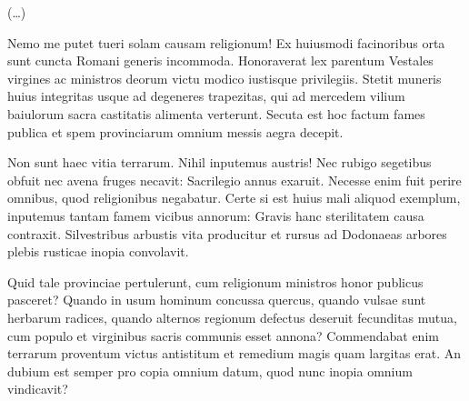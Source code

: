 (\dots)

Nemo me putet tueri solam causam religionum! Ex huiusmodi facinoribus orta sunt cuncta Romani generis incommoda. Honoraverat lex parentum Vestales virgines ac ministros deorum victu modico iustisque privilegiis. Stetit muneris huius integritas usque ad degeneres trapezitas, qui ad mercedem vilium baiulorum sacra castitatis alimenta verterunt. Secuta est hoc factum fames publica et spem provinciarum omnium messis aegra decepit.

Non sunt haec vitia terrarum. Nihil inputemus austris! Nec rubigo segetibus obfuit nec avena fruges necavit: Sacrilegio annus exaruit. Necesse enim fuit perire omnibus, quod religionibus negabatur. Certe si est huius mali aliquod exemplum, inputemus tantam famem vicibus annorum: Gravis hanc sterilitatem causa contraxit. Silvestribus arbustis vita producitur et rursus ad Dodonaeas arbores plebis rusticae inopia convolavit.

Quid tale provinciae pertulerunt, cum religionum ministros honor publicus pasceret? Quando in usum hominum concussa quercus, quando vulsae sunt herbarum radices, quando alternos regionum defectus deseruit fecunditas mutua, cum populo et virginibus sacris communis esset annona? Commendabat enim terrarum proventum victus antistitum et remedium magis quam largitas erat. An dubium est semper pro copia omnium datum, quod nunc inopia omnium vindicavit?

